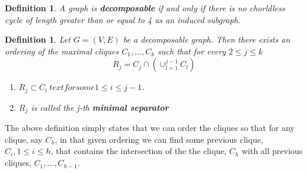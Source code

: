 \documentclass[12pt, leqno]{article}
\newtheorem{defn}[thm]{Definition}
\begin{document}
\begin{defn}A graph is \textbf{decomposable} if and only if there
is no chorldless cycle of length greater than or equal to 4 as an
induced subgraph.
\end{defn} 
\begin{defn}
\label{defn:prfctordrmxcliqs}
Let $G = (V,E)$ be a decomposable graph. Then there exists an ordering
of the maximal cliques $C_1, ... , C_k$ such that for every $2 \leq j
\leq k$
\[
R_j = C_j \cap (\cup_{l = 1}^{j-1} C_l)
\]
\begin{enumerate}
\item $R_j \subset C_i\ text{ for some } 1 \leq i \leq j-1$.
\item $R_j$ is called the j-th \textbf{minimal separator} 
\end{enumerate}
\end{defn}
The above definition simply states that we can order the cliques so
that for any clique, say $C_h$, in that given ordering we can find some previous
clique,$C_i, 1 \leq i \leq h$, that contains the intersection of the
the clique, $C_h$ with all previous cliques, $C_1,...,C_{h-1}$.
\end{document}
